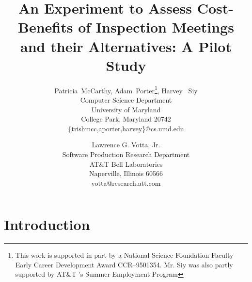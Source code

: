 %
%


\renewcommand{\topfraction}{0.95}
\renewcommand{\textfraction}{0.05}  %




\title {An Experiment to Assess Cost-Benefits of Inspection 
Meetings and their Alternatives: A Pilot Study}

\author{Patricia~McCarthy, Adam~Porter\thanks{ This work is supported in part by a National Science Foundation Faculty Early Career Development Award CCR--9501354. Mr. Siy was also partly supported by AT\&T 's Summer Employment Program}, Harvey ~Siy\\
Computer Science Department\\
University of Maryland\\
College Park, Maryland 20742\\
\{trishmcc,aporter,harvey\}@cs.umd.edu\\
%
\and
Lawrence G. Votta, Jr.\\
Software Production Research Department\\
AT\&T Bell Laboratories \\
Naperville, Illinois 60566 \\
votta@research.att.com\\
}

\maketitle
\thispagestyle{empty}

\begin{abstract}

\end{abstract}

\section{Introduction}
\label{intro}


